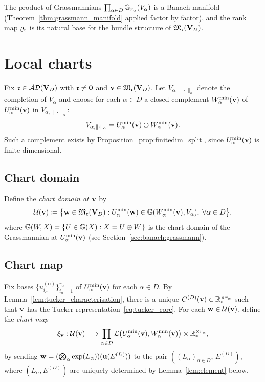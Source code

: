 The product of Grassmannians $\prod_{\alpha \in D}
\mathbb{G}_{r_\alpha}(V_\alpha)$ is a Banach manifold (Theorem~\ref{thm:grassmann_manifold}
applied factor by factor), and the rank map $\varrho_{\mathfrak{r}}$ is its
natural base for the bundle structure of $\mathfrak{M}_{\mathfrak{r}}(\mathbf{V}_D)$.

\section{Local charts}
\label{sec:tucker_manifold:charts}

Fix $\mathfrak{r} \in \mathcal{AD}(\mathbf{V}_D)$ with $\mathfrak{r} \neq \mathbf{0}$ and
$\mathbf{v} \in \mathfrak{M}_{\mathfrak{r}}(\mathbf{V}_D)$. Let $V_{\alpha,\|\cdot\|_\alpha}$
denote the completion of $V_\alpha$ and choose for each $\alpha \in D$
a closed complement $W^{\min}_{\alpha}(\mathbf{v})$ of $U^{\min}_{\alpha}(\mathbf{v})$ in
$V_{\alpha,\|\cdot\|_\alpha}$:
\begin{equation*}
    V_{\alpha,\|\cdot\|_\alpha}
    = U^{\min}_{\alpha}(\mathbf{v}) \oplus W^{\min}_{\alpha}(\mathbf{v}).
\end{equation*}
Such a complement exists by Proposition~\ref{prop:finitedim_split},
since $U^{\min}_{\alpha}(\mathbf{v})$ is finite-dimensional.

\subsection*{Chart domain}

Define the \emph{chart domain at $\mathbf{v}$} by
\begin{equation}
\label{eq:chart_domain}
    \mathcal{U}(\mathbf{v}) \coloneqq
    \bigl\{
        \mathbf{w} \in \mathfrak{M}_{\mathfrak{r}}(\mathbf{V}_D) :
        U^{\min}_{\alpha}(\mathbf{w}) \in
        \mathbb{G}(W^{\min}_{\alpha}(\mathbf{v}), V_\alpha),\;
        \forall \alpha \in D
    \bigr\},
\end{equation}
where $\mathbb{G}(W, X) = \{U \in \mathbb{G}(X) : X = U \oplus W\}$ is
the chart domain of the Grassmannian at $U^{\min}_{\alpha}(\mathbf{v})$
(see Section~\ref{sec:banach:grassmann}).

\subsection*{Chart map}

Fix bases $\{u^{(\alpha)}_{i_\alpha}\}_{i_\alpha=1}^{r_\alpha}$ of
$U^{\min}_{\alpha}(\mathbf{v})$ for each $\alpha \in D$. By
Lemma~\ref{lem:tucker_characterisation}, there is a unique
$C^{(D)}(\mathbf{v}) \in \mathbb{R}^{\times r_\alpha}_*$ such that $\mathbf{v}$ has the
Tucker representation~\eqref{eq:tucker_core}.
For each $\mathbf{w} \in \mathcal{U}(\mathbf{v})$, define the \emph{chart map}
\begin{equation}
\label{eq:chart_map}
    \xi_{\mathbf{v}} : \mathcal{U}(\mathbf{v})
    \longrightarrow
    \prod_{\alpha \in D} \mathcal{L}\bigl(U^{\min}_{\alpha}(\mathbf{v}),
        W^{\min}_{\alpha}(\mathbf{v})\bigr)
    \times \mathbb{R}^{\times r_\alpha}_*,
\end{equation}
by sending $\mathbf{w} = (\bigotimes_\alpha \exp(L_\alpha))(\mathbf{u}(E^{(D)}))$
to the pair $((L_\alpha)_{\alpha \in D},\, E^{(D)})$, where
$(L_\alpha, E^{(D)})$ are uniquely determined by
Lemma~\ref{lem:element} below.

